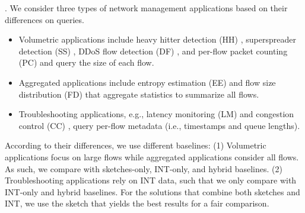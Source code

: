 . We consider three types of network management applications based on their differences on queries.



\begin{itemize}[leftmargin=*]
%
    \item Volumetric applications include heavy hitter detection (HH) \cite{huang2017sketchvisor}, superspreader detection (SS) \cite{tang2019mv}, DDoS flow detection (DF) \cite{liu2021jaqen}, and per-flow packet counting (PC) \cite{huang2017sketchvisor} and query the size of each flow. 
%
    \item Aggregated applications include entropy estimation (EE) \cite{liu2016one} and flow size distribution (FD) \cite{chen2021mtp} that aggregate statistics to summarize all flows. %
%
    \item Troubleshooting applications, e.g., latency monitoring (LM) and congestion control (CC) \cite{ben2020pint,sheng2021deltaint}, query per-flow metadata (i.e., timestamps and queue lengths).
%
\end{itemize}

\noindent According to their differences, we use different baselines: (1) Volumetric applications focus on large flows while aggregated applications consider all flows. As such, we compare \sysname with sketches-only, INT-only, and hybrid baselines. (2) Troubleshooting applications rely on INT data, such that we only compare \sysname with INT-only and hybrid baselines. For the solutions that combine both sketches and INT, we use the sketch that yields the best results for a fair comparison. 

